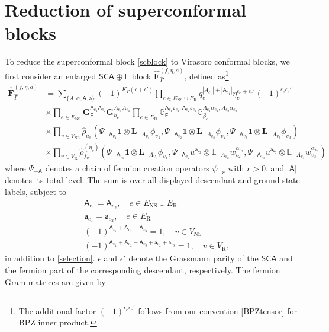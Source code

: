 \documentclass[12pt]{article}
\def\ie{\begin{equation}\begin{aligned}}
\def\fe{\end{aligned}\end{equation}}
\def\NS{\mathrm{NS}}
\def\R{\mathrm{R}}
\def\F{\mathsf{F}}
\begin{document}
\section{Reduction of superconformal blocks}

\label{sec:blockdecomp}

To reduce the superconformal block \eqref{scblock} to Virasoro conformal blocks, we first consider an enlarged $\mathsf{SCA}\oplus \mathsf{F}$ block $\widehat{\mathbf{F}}^{(f,\eta,a)}_{\hat{\Gamma}}$, defined as\footnote{The additional factor $(-1)^{\epsilon_e \epsilon_e'}$ follows from our convention \eqref{BPZtensor} for BPZ inner product.}
\ie 
\widehat{\mathbf{F}}^{(f,\eta,a)}_{\hat{\Gamma}} &= \sum_{\{A,\alpha,\mathsf{A},\mathsf{a}\}} (-1)^{K_{\Gamma}(\epsilon+\epsilon')} \prod_{e\in E_\NS\cup E_\R} q_e^{|A_{e_1}|+|\mathsf{A}_{e_1}|}\eta_e^{\epsilon_e+\epsilon_e'}(-1)^{\epsilon_e\epsilon_e'}\\
&\times \prod_{e\in E_\NS} \mathbf{G}_{\F}^{\mathsf{A}_{e_1}\mathsf{A}_{e_2}}  \mathbf{G}_{h_e}^{A_{e_1}A_{e_2}} \prod_{e\in E_\R} \mathbb{G}_{\F}^{\mathsf{A}_{e_1}\mathsf{a}_{e_1},\mathsf{A}_{e_2}\mathsf{a}_{e_2}} \mathbb{G}_{\beta_e}^{A_{e_1}\alpha_{e_1},A_{e_2}\alpha_{e_2}}\\
&\times \prod_{v \in V_\NS} \hat{\rho}_{a_v}(\Psi_{-\mathsf{A}_{v_1}}\mathbf{1}\otimes \mathbf L_{-A_{v_1}}\phi_{v_1},\Psi_{-\mathsf{A}_{v_2}}\mathbf{1}\otimes \mathbf L_{-A_{v_2}}\phi_{v_2},\Psi_{-\mathsf{A}_{v_3}}\mathbf{1}\otimes \mathbf L_{-A_{v_3}}\phi_{v_3})\\
&\times\prod_{v\in V_\R}\hat{\rho}_{f_v}^{(\eta_v)}(\Psi_{-\mathsf{A}_{v_1}}\mathbf{1}\otimes \mathbf L_{-A_{v_1}}\phi_{v_1},\Psi_{-\mathsf{A}_{v_2}} u^{\mathsf{a_{v_2}}}\otimes\mathbb L_{-A_{v_2}}w_{v_2}^{\alpha_{v_2}},\Psi_{-\mathsf{A}_{v_3}} u^{\mathsf{a_{v_3}}}\otimes\mathbb L_{-A_{v_3}}w_{v_3}^{\alpha_{v_3}})
\fe
where $\Psi_{-\mathsf{A}}$ denotes a chain of fermion creation operators $\psi_{-r}$ with $r>0$, and $|\mathsf{A}|$ denotes its total level. The sum is over all displayed descendant and ground state labels, subject to
\ie \label{Fselection}
&\mathsf{A}_{e_1} = \mathsf{A}_{e_2},\quad e\in E_{\NS}\cup E_\R\\
&\mathsf{a}_{e_1} = \mathsf{a}_{e_2},\quad e\in E_\R\\
&(-1)^{\mathsf{A}_{v_1}+\mathsf{A}_{v_2}+\mathsf{A}_{v_3}} = 1,\quad v\in V_{\NS}\\
&(-1)^{\mathsf{A}_{v_1}+\mathsf{A}_{v_2}+\mathsf{A}_{v_3}+\mathsf{a}_{v_2}+\mathsf{a}_{v_3}} = 1,\quad v\in V_{\R},
\fe
in addition to \eqref{selection}. $\epsilon$ and $\epsilon'$ denote the Grassmann parity of the $\mathsf{SCA}$ and the fermion part of the corresponding descendant, respectively. The fermion Gram matrices are given by
\end{document}
